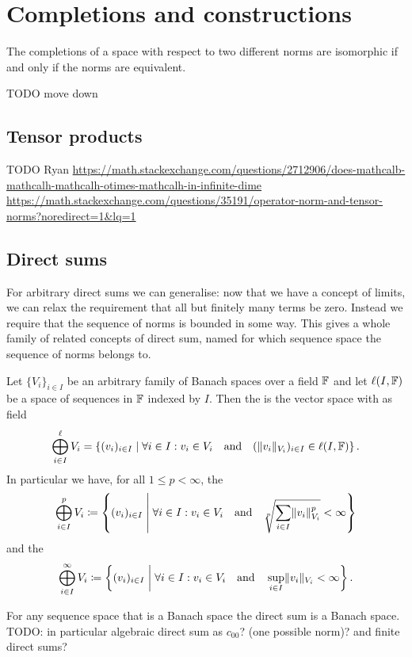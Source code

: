 \section{Completions and constructions}

\begin{proposition}
The completions of a space with respect to two different norms are isomorphic \textup{if and only if} the norms are equivalent.
\end{proposition}

TODO move down
\subsection{Tensor products}
TODO Ryan
\url{https://math.stackexchange.com/questions/2712906/does-mathcalb-mathcalh-mathcalh-otimes-mathcalh-in-infinite-dime}
\url{https://math.stackexchange.com/questions/35191/operator-norm-and-tensor-norms?noredirect=1&lq=1}

\subsection{Direct sums}

For arbitrary direct sums we can generalise: now that we have a concept of limits, we can relax the requirement that all but finitely many terms be zero. Instead we require that the sequence of norms is bounded in some way. This gives a whole family of related concepts of direct sum, named for which sequence space the sequence of norms belongs to.
\begin{definition}
Let $\{V_i\}_{i\in I}$ be an arbitrary family of Banach spaces over a field $\mathbb{F}$ and let $\ell(I,\mathbb{F})$ be a space of sequences in $\mathbb{F}$ indexed by $I$. Then the  is the vector space with as field
\[ \bigoplus_{i\in I}^\ell V_i = \left\{ (v_i)_{i\in I} \;\middle|\; \forall i\in I: v_i\in V_i \quad\text{and}\quad (\lVert v_i\rVert_{V_i})_{i\in I}\in \ell(I,\mathbb{F})  \right\}. \]
In particular we have, for all $1\leq p<\infty$, the 
\[ \bigoplus_{i\in I}^p V_i \coloneqq \left\{ (v_i)_{i\in I} \;\middle|\; \forall i\in I: v_i\in V_i \quad\text{and}\quad \sqrt[p]{\sum_{i\in I}\lVert v_i\rVert_{V_i}^p}<\infty \right\} \]
and the 
\[ \bigoplus_{i\in I}^\infty V_i \coloneqq \left\{ (v_i)_{i\in I} \;\middle|\; \forall i\in I: v_i\in V_i \quad\text{and}\quad \sup_{i\in I}\lVert v_i\rVert_{V_i}<\infty \right\}. \]
\end{definition}

\begin{proposition}
For any sequence space that is a Banach space the direct sum is a Banach space. TODO: in particular algebraic direct sum as $c_{00}$? (one possible norm)? and finite direct sums?
\end{proposition}

